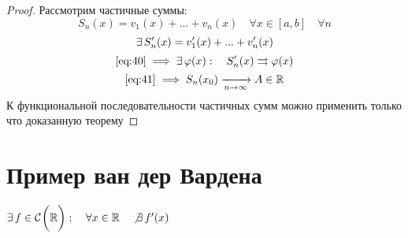 \begin{proof}
	Рассмотрим частичные суммы:
	$$ S_n(x) = v_1(x) + ... + v_n(x) \quad \forall x \in [a, b] \quad \forall n $$
	$$ \exists\, S_n'(x) = v_1'(x) + ... + v_n'(x) $$
	$$ \eref{40} \implies \exist \vphi(x) : \quad S_n'(x) \rightrightarrows \vphi(x) $$
	$$ \eref{41} \implies S_n(x_0) \infarr{n} A \in \R $$
	К функциональной последовательности частичных сумм можно применить только что доказанную теорему
\end{proof}

\section{Пример ван дер Вардена}

\begin{theorem}
	$ \exists\, f \in \mathcal{C}^{} \bigg( {\mathbb{R}} \bigg)  : \quad \forall x \in \mathbb{R} \quad \not\exists\, f'(x) $
\end{theorem}

